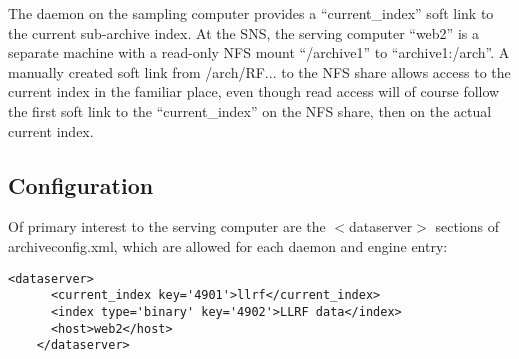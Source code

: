 The daemon on the sampling computer provides a
``current\_index'' soft link to the current sub-archive index.
At the SNS, the serving computer ``web2'' is a separate machine with
a read-only NFS mount ``/archive1'' to ``archive1:/arch''.
A manually created soft link from /arch/RF... to the NFS share allows
access to the current index in the familiar place, even though read
access will of course follow the first soft link to the
``current\_index'' on the NFS share,
then on the actual current index.


\subsection{Configuration}
Of primary interest to the serving computer are the $<$dataserver$>$
sections of archiveconfig.xml, which are allowed for each daemon and
engine entry:

\begin{lstlisting}[frame=none,keywordstyle=\sffamily]
    <dataserver>
      <current_index key='4901'>llrf</current_index>
      <index type='binary' key='4902'>LLRF data</index>
      <host>web2</host>
    </dataserver>
\end{lstlisting}

